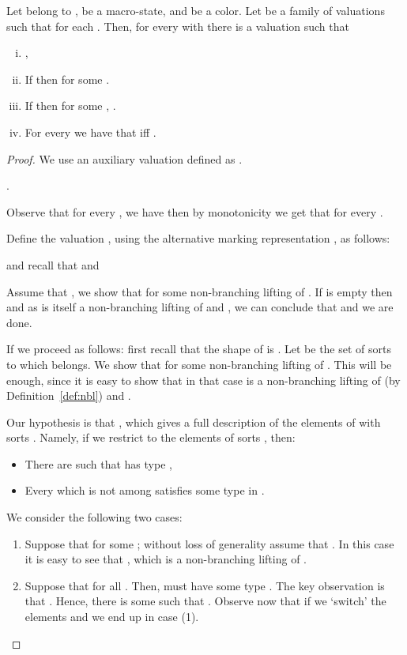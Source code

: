 \begin{lemma}\label{lem:os-alt-to-nd}
	Let  belong to ,  be a macro-state, and  be a color. Let  be a family of valuations such that  for each .
Then, for every  with  there is a valuation  such that
		\begin{enumerate}[(i)]
			 pt
			\item ,
			\item If  then
				 for some .
			\item If  then
				 for some , .
			\item For every  we have that  iff .
		\end{enumerate}
\end{lemma}
\begin{proof}
	We use an auxiliary valuation  defined as .

	\begin{claimfirst}
		.
	\end{claimfirst}
\begin{pfclaim}
		Observe that for every ,  we have  then by monotonicity we get that  for every .
	\end{pfclaim}
Define the valuation , using the alternative marking representation , as follows:
	
	and recall that  and
	
Assume that , we show that  for some non-branching lifting of . If  is empty then  and as  is itself a non-branching lifting of  and , we can conclude that  and we are done.

	If  we proceed as follows: first recall that the shape of  is . Let  be the set of sorts to which  belongs. We show that  for some non-branching lifting  of . This will be enough, since it is easy to show that in that case  is a non-branching lifting of  (by Definition~\ref{def:nbl}) and .

	Our hypothesis is that , which gives a full description of the elements of  with sorts . Namely, if we restrict to the elements of sorts , then:
\begin{itemize}
		\itemsep 0pt
		\item There are  such that  has type ,
		\item Every  which is not among  satisfies some type in .
	\end{itemize}
We consider the following two cases:
	\begin{enumerate}[(1)]
		\item Suppose that  for some ; without loss of generality assume that . In this case it is easy to see that , which is a non-branching lifting of .
\item Suppose that  for all . Then,  must have some type . The key observation is that . Hence, there is some  such that . Observe now that if we `switch' the elements  and  we end up in case (1).\qedhere
	\end{enumerate}
\end{proof}

